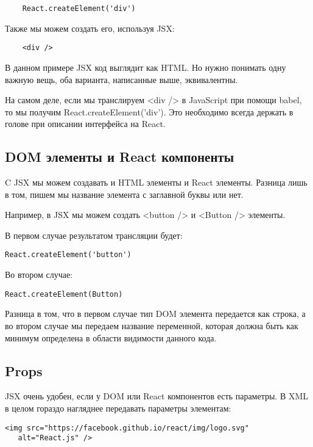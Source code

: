 \begin{lstlisting}
	React.createElement('div')
\end{lstlisting}

Также мы можем создать его, используя JSX:

\begin{lstlisting}
	<div />
\end{lstlisting}

В данном примере JSX код выглядит как HTML. Но нужно понимать одну важную вещь, оба варианта, написанные выше, эквивалентны. 

На самом деле, если мы транслируем <div /> в JavaScript при помощи babel, то мы получим React.createElement('div'). Это необходимо всегда держать в голове при описании интерфейса на React.

\subsection{DOM элементы и React компоненты}

C JSX мы можем создавать и HTML элементы и React элементы. Разница лишь в том, пишем мы название элемента с заглавной буквы или нет.

Например, в JSX мы можем создать <button /> и <Button /> элементы.

В первом случае результатом трансляции будет:

\begin{lstlisting}
React.createElement('button')
\end{lstlisting}

Во втором случае:

\begin{lstlisting}
React.createElement(Button)
\end{lstlisting}

Разница в том, что в первом случае тип DOM элемента передается как строка, а во втором случае мы передаем название переменной, которая должна быть как минимум определена в области видимости данного кода.

\subsection{Props}

JSX очень удобен, если у DOM или React компонентов есть параметры. В XML в целом гораздо нагляднее передавать параметры элементам:
   
\begin{lstlisting}
<img src="https://facebook.github.io/react/img/logo.svg"
   alt="React.js" />
\end{lstlisting}

